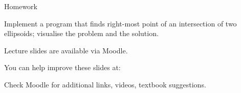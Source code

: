 \documentclass{beamer}
\begin{document}
\begin{frame}{Homework}
\begin{flushleft}

Implement a program that finds right-most point of an intersection of two ellipsoids; visualise the problem and the solution.

\end{flushleft}
\end{frame}




\begin{frame}
	\centerline{Lecture slides are available via Moodle.}
	\bigskip
	\centerline{You can help improve these slides at:}
	\centerline{
		\mygit
	}
	\bigskip
	
	\textcolor{black}{}
	\bigskip
	
	
	\centerline{Check Moodle for additional links, videos, textbook suggestions.}
\end{frame}
\end{document}
